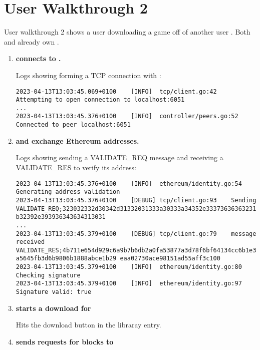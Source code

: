 
\section*{User Walkthrough 2}

User walkthrough 2 shows a user  downloading a game  off of another user . Both  and  already own .

\begin{enumerate}[itemsep=2.5pt]
  \item \textbf{ connects to .}
  
  Logs showing  forming a TCP connection with : 
\begin{lstlisting}[breaklines=true, postbreak=\mbox{\textcolor{red}{$\hookrightarrow$}\space}]
2023-04-13T13:03:45.069+0100	[INFO]	tcp/client.go:42	Attempting to open connection to localhost:6051
...
2023-04-13T13:03:45.376+0100	[INFO]	controller/peers.go:52	Connected to peer localhost:6051
\end{lstlisting}

  \item \textbf{ and  exchange Ethereum addresses.}
  
  Logs showing  sending  a VALIDATE\_REQ message and receiving a VALIDATE\_RES to verify its address: 
\begin{lstlisting}[breaklines=true, postbreak=\mbox{\textcolor{red}{$\hookrightarrow$}\space}]
2023-04-13T13:03:45.376+0100	[INFO]	ethereum/identity.go:54	Generating address validation
2023-04-13T13:03:45.376+0100	[DEBUG]	tcp/client.go:93	Sending VALIDATE_REQ;323032332d30342d31332031333a30333a34352e33373636363231202b3031303020425354206d3d2 b32392e393936343634313031
...
2023-04-13T13:03:45.379+0100	[DEBUG]	tcp/client.go:79	message received VALIDATE_RES;4b711e654d929c6a9b7b6db2a0fa53877a3d78f6bf64134cc6b1e35f2ff029682fbb484d74 a5645fb3d6b9806b1888abce1b29 eaa02730ace98151ad55aff3c100
2023-04-13T13:03:45.379+0100	[INFO]	ethereum/identity.go:80	Checking signature
2023-04-13T13:03:45.379+0100	[INFO]	ethereum/identity.go:97	Signature valid: true
\end{lstlisting}

  \item \textbf{ starts a download for }
  
   Hits the download button in the libraray entry.

  \item \textbf{ sends requests for blocks to }
  

\end{enumerate}
